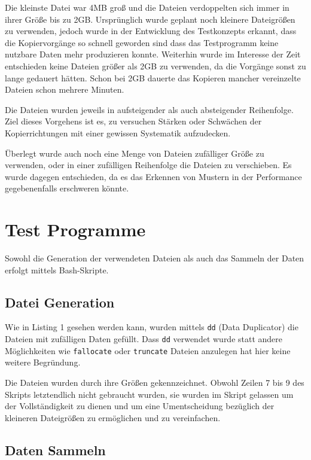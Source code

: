 \documentclass[11pt,parskip=full]{scrartcl}
\begin{document}
	Die kleinste Datei war 4MB groß und die Dateien verdoppelten sich immer in ihrer Größe bis zu 2GB. Ursprünglich wurde geplant noch kleinere Dateigrößen zu verwenden, jedoch wurde in der Entwicklung des Testkonzepts erkannt, dass die Kopiervorgänge so schnell geworden sind dass das Testprogramm keine nutzbare Daten mehr produzieren konnte. Weiterhin wurde im Interesse der Zeit entschieden keine Dateien größer als 2GB zu verwenden, da die Vorgänge sonst zu lange gedauert hätten. Schon bei 2GB dauerte das Kopieren mancher vereinzelte Dateien schon mehrere Minuten.
	
	Die Dateien wurden jeweils in aufsteigender als auch absteigender Reihenfolge. Ziel dieses Vorgehens ist es, zu versuchen Stärken oder Schwächen der Kopierrichtungen mit einer gewissen Systematik aufzudecken.
	
	Überlegt wurde auch noch eine Menge von Dateien zufälliger Größe zu verwenden, oder in einer zufälligen Reihenfolge die Dateien zu verschieben. Es wurde dagegen entschieden, da es das Erkennen von Mustern in der Performance gegebenenfalls erschweren könnte.
	

\section{Test Programme}
	Sowohl die Generation der verwendeten Dateien als auch das Sammeln der Daten erfolgt mittels Bash-Skripte.
\subsection{Datei Generation}
	Wie in Listing 1 gesehen werden kann, wurden mittels \lstinline|dd| (Data Duplicator) die Dateien mit zufälligen Daten gefüllt. Dass \lstinline|dd| verwendet wurde statt andere Möglichkeiten wie \lstinline|fallocate| oder \lstinline|truncate| Dateien anzulegen hat hier keine weitere Begründung.
	
	Die Dateien wurden durch ihre Größen gekennzeichnet. Obwohl Zeilen 7 bis 9 des Skripts letztendlich nicht gebraucht wurden, sie wurden im Skript gelassen um der Vollständigkeit zu dienen und um eine Umentscheidung bezüglich der kleineren Dateigrößen zu ermöglichen und zu vereinfachen.
	
	
\subsection{Daten Sammeln}
\end{document}
